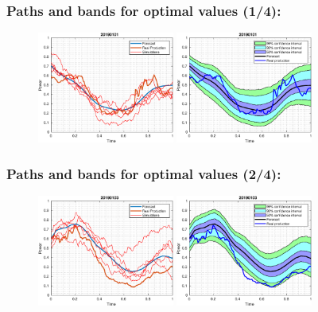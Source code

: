 \documentclass[aspectratio=169]{beamer}\usepackage[utf8]{inputenc}
\begin{document}
\begin{frame}\frametitle{Paths and bands for optimal values (1/4):}

\begin{figure}[ht!]
\centering
\includegraphics[width=0.4\textwidth]{../Results/paths_testing_days/optimal_value/1.eps}\quad
\includegraphics[width=0.4\textwidth]{../Results/bands_testing_days/optimal_value/1.eps}
\end{figure}

\end{frame}


\begin{frame}\frametitle{Paths and bands for optimal values (2/4):}

\begin{figure}[ht!]
\centering
\includegraphics[width=0.4\textwidth]{../Results/paths_testing_days/optimal_value/2.eps}\quad
\includegraphics[width=0.4\textwidth]{../Results/bands_testing_days/optimal_value/2.eps}
\end{figure}

\end{frame}
\end{document}
